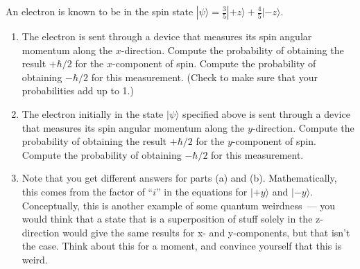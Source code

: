 \begin{problem}
An electron is known to be in the spin state $|\psi\rangle =
  \frac{3}{5}|\mbox{$+z$}\rangle + \frac{4}{5}|\mbox{$-z$}\rangle$.

  \begin{enumerate}
  \item The electron is sent
  through a device that measures its spin angular momentum along the
  $x$-direction.  Compute the probability of obtaining the result
  $+\hbar/2$ for the $x$-component of spin.  Compute the
  probability of obtaining $-\hbar/2$ for this measurement.  (Check to make
  sure that your probabilities add up to 1.)
  \item The electron initially in the state $|\psi\rangle$ specified
  above is sent through a device that measures its spin angular
  momentum along the $y$-direction.  Compute the probability of
  obtaining the result $+\hbar/2$ for the $y$-component of spin.
  Compute the probability of obtaining $-\hbar/2$ for this
  measurement.
  \item Note that you get different answers for parts (a) and (b).
  Mathematically, this comes from the factor of ``$i$'' in the
  equations for $|\mbox{$+y$}\rangle$ and $|\mbox{$-y$}\rangle$.
  Conceptually, this is another example of some quantum weirdness~---
  you would think that a state that is a superposition of stuff solely
  in the z-direction would give the same results for x- and
  y-components, but that isn't the case.  Think about this for a
  moment, and convince yourself that this is weird.
 \end{enumerate}
\label{prob:spin_ii}
\end{problem}



